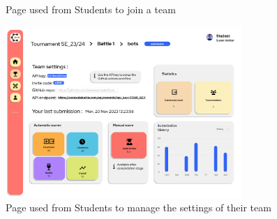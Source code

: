 \begin{enumerate}[label=\textbf{F\arabic*)}]
\begin{figure}[H]
        \caption{Page used from Students to join a team}
    \end{figure}
    \begin{figure}[H]
        \centering
        \includegraphics[width=0.8\textwidth]{Mockups/15_student_team.png}
        \caption{Page used from Students to manage the settings of their team}
    \end{figure}
    

\end{enumerate}
